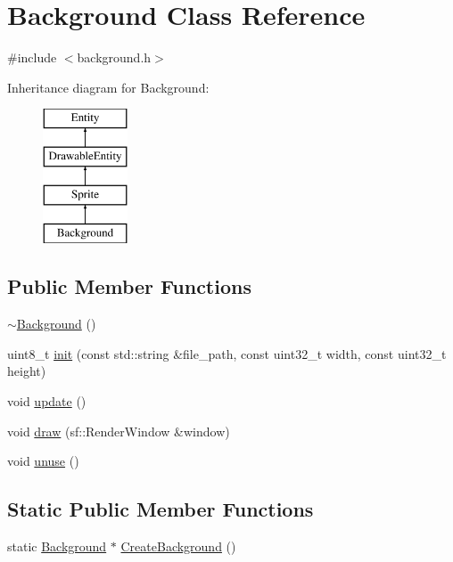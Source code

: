 \hypertarget{class_background}{}\section{Background Class Reference}
\label{class_background}


{\ttfamily \#include $<$background.\+h$>$}

Inheritance diagram for Background\+:\begin{figure}[H]
\begin{center}
\leavevmode
\includegraphics[height=4.000000cm]{class_background}
\end{center}
\end{figure}
\subsection*{Public Member Functions}
\begin{DoxyCompactItemize}
\item 
\hyperlink{class_background_a36754df1deb720393217ade59da41557}{$\sim$\+Background} ()
\item 
uint8\+\_\+t \hyperlink{class_background_ae4ae960cd876ef4a2f9fb6e0a7e8bc73}{init} (const std\+::string \&file\+\_\+path, const uint32\+\_\+t width, const uint32\+\_\+t height)
\item 
void \hyperlink{class_background_acab58b65d4299d4bd51b8376e8c3e3d3}{update} ()
\item 
void \hyperlink{class_background_ae3d10fe0882df48b0e1e861a7e69f37f}{draw} (sf\+::\+Render\+Window \&window)
\item 
void \hyperlink{class_background_a544eaaa5b1b55c6adebe989633521ac3}{unuse} ()
\end{DoxyCompactItemize}
\subsection*{Static Public Member Functions}
\begin{DoxyCompactItemize}
\item 
static \hyperlink{class_background}{Background} $\ast$ \hyperlink{class_background_aafc5996195781b2d4bff7d170792425d}{Create\+Background} ()
\end{DoxyCompactItemize}
